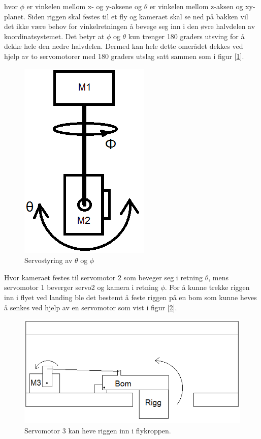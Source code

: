 hvor $\phi$ er vinkelen mellom x- og y-aksene og $\theta$ er vinkelen mellom z-aksen og xy-planet. Siden riggen skal festes til et fly og kameraet skal se ned på bakken vil det ikke være behov for vinkelretningen å bevege seg inn i den øvre halvdelen av koordinatsystemet. Det betyr at $\phi$ og $\theta$ kun trenger 180 graders utsving for å dekke hele den nedre halvdelen. Dermed kan hele dette omerådet dekkes ved hjelp av to servomotorer med 180 graders utslag satt sammen som i figur [\ref{fig:IdeRigg}]. 

\begin{figure}[h!]
	\centering
	\includegraphics[scale=0.5]{img/BasicRiggIde.png}
	\caption{Servostyring av $\theta$ og $\phi$}
	\label{fig:IdeRigg}
\end{figure}

Hvor kameraet festes til servomotor 2 som beveger seg i retning $\theta$, mens servomotor 1 beverger servo2 og kamera i retning $\phi$. For å kunne trekke riggen inn i flyet ved landing ble det bestemt å feste riggen på en bom som kunne heves å senkes ved hjelp av en servomotor som vist i figur [\ref{fig:bom}].

\begin{figure}[h!]
	\centering
	\includegraphics[scale=0.5]{img/Motor3.png}
	\caption{Servomotor 3 kan heve riggen inn i flykroppen.}
	\label{fig:bom}
\end{figure}


